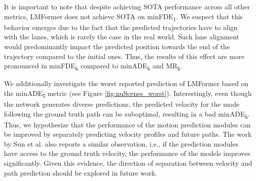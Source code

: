 It is important to note that despite achieving SOTA performance across all other metrics, LMFormer does not achieve SOTA on minFDE\textsubscript{1}. We suspect that this behavior emerges due to the fact that the predicted trajectories have to align with the lanes, which is rarely the case in the real world. Such lane alignment would predominantly impact the predicted position towards the end of the trajectory compared to the initial ones. Thus, the results of this effect are more pronounced in minFDE\textsubscript{k} compared to minADE\textsubscript{k} and MR\textsubscript{k}.

We additionally investigate the worst reported prediction of LMFormer based on the minADE\textsubscript{5} metric (see Figure \ref{fig:nuScenes_worst}). Interestingly, even though the network generates diverse predictions, the predicted velocity for the mode following the ground truth path can be suboptimal, resulting in a bad minADE\textsubscript{k}. Thus, we hypothesize that the performance of the motion prediction modules can be improved by separately predicting velocity profiles and future paths. The work by Sun et al. \cite{sun2024semanticformer} also reports a similar observation, i.e., if the prediction modules have access to the ground truth velocity, the performance of the models improves significantly. Given this evidence, the direction of separation between velocity and path prediction should be explored in future work. 


